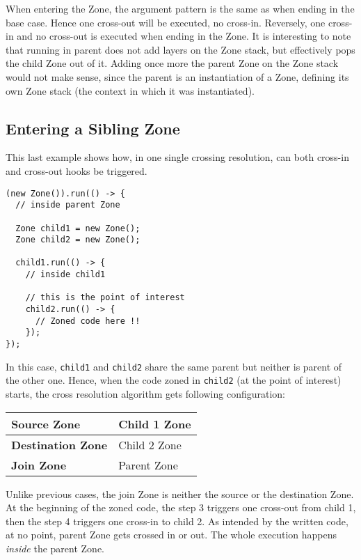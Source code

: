 When entering the Zone, the argument pattern is the same as when ending in the base case. Hence one cross-out will be executed, no cross-in. Reversely, one cross-in and no cross-out is executed when ending in the Zone.
It is interesting to note that running in parent does not add layers on the Zone stack, but effectively pops the child Zone out of it. Adding once more the parent Zone on the Zone stack would not make sense, since the parent is an instantiation of a Zone, defining its own Zone stack (the context in which it was instantiated).


\subsection*{Entering a Sibling Zone}

This last example shows how, in one single crossing resolution, can both cross-in and cross-out hooks be triggered.

\begin{lstlisting}
(new Zone()).run(() -> {
  // inside parent Zone

  Zone child1 = new Zone();
  Zone child2 = new Zone();

  child1.run(() -> {
    // inside child1
    
    // this is the point of interest
    child2.run(() -> {
      // Zoned code here !!
    });
});
\end{lstlisting}

In this case, \lstinline{child1} and \lstinline{child2} share the same parent but neither is parent of the other one. Hence, when the code zoned in \lstinline{child2} (at the point of interest) starts, the cross resolution algorithm gets following configuration:

\begin{tabular}{| l | l |}
\hline
\textbf{Source Zone} & Child 1 Zone
\\ \hline
\textbf{Destination Zone} & Child 2 Zone
\\ \hline
\textbf{Join Zone} & Parent Zone
\\ \hline
\end{tabular}

Unlike previous cases, the join Zone is neither the source or the destination Zone. At the beginning of the zoned code, the step 3 triggers one cross-out from child 1, then the step 4 triggers one cross-in to child 2. As intended by the written code, at no point, parent Zone gets crossed in or out. The whole execution happens \emph{inside} the parent Zone.


